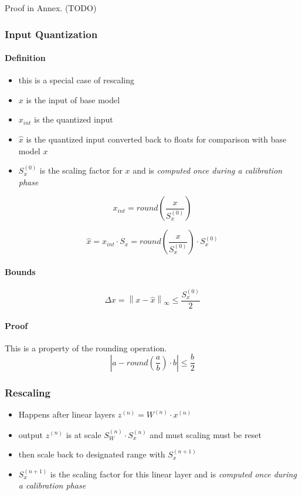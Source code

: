 \documentclass[11pt, a4paper]{article}
\newcommand{\norm}[1]{\left\|#1\right\|}
\newcommand{\SW}{S_W}
\newcommand{\Sx}{S_x}
\newcommand{\Sxz}{S_x^{(0)}}
\newcommand{\xn}{x^{(n)}}
\newcommand{\SWn}{S_W^{(n)}}
\newcommand{\Sxn}{S_x^{(n)}}
\newcommand{\Sxnpo}{S_x^{(n+1)}}
\begin{document}
Proof in Annex. (TODO)


\subsubsection{Input Quantization}

\paragraph{Definition}
\begin{itemize}
    \item this is a special case of rescaling
    \item $x$ is the input of base model
    \item $x_{int}$ is the quantized input
    \item $\hat{x}$ is the quantized input converted back to floats for comparison with base model $x$
    \item $\Sxz$ is the scaling factor for $x$ and is \emph{computed once during a calibration phase}
\end{itemize}

$$    x_{int} = round\!\left(\frac{x}{\Sxz}\right)$$

$$
    \hat{x} = x_{int} \cdot \Sx = round\!\left(\frac{x}{\Sxz}\right) \cdot \Sxz
$$


\paragraph{Bounds}

\begin{equation}
 \Delta x = \norm{ x - \hat{x}}_{\infty}
\leq \frac{\Sxz}{2}
\end{equation}

\paragraph{Proof}
This is a property of the rounding operation.
$$|a - round(\frac{a}{b}) \cdot b| \leq \frac{b}{2}$$


\subsubsection{Rescaling}
\begin{itemize}
	\item Happens after linear layers $z^{(n)} = W^{(n)} \cdot \xn$
	\item output $z^{(n)}$ is at scale $\SWn \cdot \Sxn$ and must scaling must be reset
	\item then scale back to designated range with $\Sxnpo$
	\item $\Sxnpo$ is the scaling factor for this linear layer and is \emph{computed once during a calibration phase}
\end{itemize}
\end{document}

